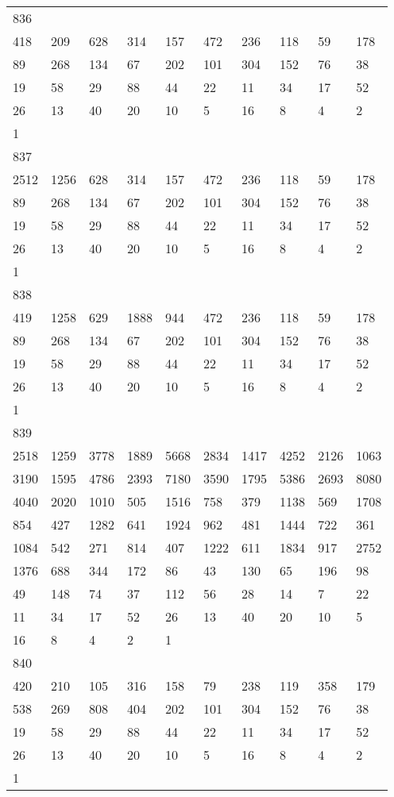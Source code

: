 \begin{longtable}{*{10}{l}}
836&&&&&&&&&\\
418& 209& 628& 314& 157& 472& 236& 118& 59& 178\\
89& 268& 134& 67& 202& 101& 304& 152& 76& 38\\
19& 58& 29& 88& 44& 22& 11& 34& 17& 52\\
26& 13& 40& 20& 10& 5& 16& 8& 4& 2\\
1& \\

837&&&&&&&&&\\
2512& 1256& 628& 314& 157& 472& 236& 118& 59& 178\\
89& 268& 134& 67& 202& 101& 304& 152& 76& 38\\
19& 58& 29& 88& 44& 22& 11& 34& 17& 52\\
26& 13& 40& 20& 10& 5& 16& 8& 4& 2\\
1& \\

838&&&&&&&&&\\
419& 1258& 629& 1888& 944& 472& 236& 118& 59& 178\\
89& 268& 134& 67& 202& 101& 304& 152& 76& 38\\
19& 58& 29& 88& 44& 22& 11& 34& 17& 52\\
26& 13& 40& 20& 10& 5& 16& 8& 4& 2\\
1& \\

839&&&&&&&&&\\
2518& 1259& 3778& 1889& 5668& 2834& 1417& 4252& 2126& 1063\\
3190& 1595& 4786& 2393& 7180& 3590& 1795& 5386& 2693& 8080\\
4040& 2020& 1010& 505& 1516& 758& 379& 1138& 569& 1708\\
854& 427& 1282& 641& 1924& 962& 481& 1444& 722& 361\\
1084& 542& 271& 814& 407& 1222& 611& 1834& 917& 2752\\
1376& 688& 344& 172& 86& 43& 130& 65& 196& 98\\
49& 148& 74& 37& 112& 56& 28& 14& 7& 22\\
11& 34& 17& 52& 26& 13& 40& 20& 10& 5\\
16& 8& 4& 2& 1& \\

840&&&&&&&&&\\
420& 210& 105& 316& 158& 79& 238& 119& 358& 179\\
538& 269& 808& 404& 202& 101& 304& 152& 76& 38\\
19& 58& 29& 88& 44& 22& 11& 34& 17& 52\\
26& 13& 40& 20& 10& 5& 16& 8& 4& 2\\
1& \\


\end{longtable}
